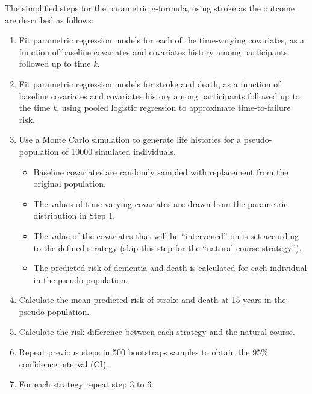 \documentclass[
]{book}
\begin{document}
The simplified steps for the parametric g-formula, using stroke as the outcome are described as follows:

\begin{enumerate}
\def\labelenumi{\arabic{enumi}.}
\item
  Fit parametric regression models for each of the time-varying covariates, as a function of baseline covariates and covariates history among participants followed up to time \emph{k}.
\item
  Fit parametric regression models for stroke and death, as a function of baseline covariates and covariates history among participants followed up to the time \emph{k}, using pooled logistic regression to approximate time-to-failure risk.
\item
  Use a Monte Carlo simulation to generate life histories for a pseudo-population of 10000 simulated individuals.

  \begin{itemize}
  \item
    Baseline covariates are randomly sampled with replacement from the original population.
  \item
    The values of time-varying covariates are drawn from the parametric distribution in Step 1.
  \item
    The value of the covariates that will be ``intervened'' on is set according to the defined strategy (skip this step for the ``natural course strategy'').
  \item
    The predicted risk of dementia and death is calculated for each individual in the pseudo-population.
  \end{itemize}
\item
  Calculate the mean predicted risk of stroke and death at 15 years in the pseudo-population.
\item
  Calculate the risk difference between each strategy and the natural course.
\item
  Repeat previous steps in 500 bootstraps samples to obtain the 95\% confidence interval (CI).
\item
  For each strategy repeat step 3 to 6.
\end{enumerate}
\end{document}
